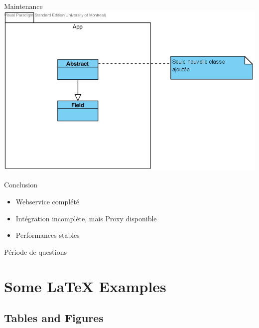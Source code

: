\documentclass{beamer}
\begin{document}
\begin{frame}{Maintenance}
\includegraphics[width=\linewidth,height=\textheight,keepaspectratio]{maintenance.png}
\end{frame}


\begin{frame}{Conclusion}
\begin{itemize}
  \item Webservice complété
  \item Intégration incomplète, mais Proxy disponible
  \item Performances stables
\end{itemize}

\end{frame}


\begin{frame}{Période de questions}

\end{frame}

\section{Some \LaTeX{} Examples}

\subsection{Tables and Figures}
\end{document}
